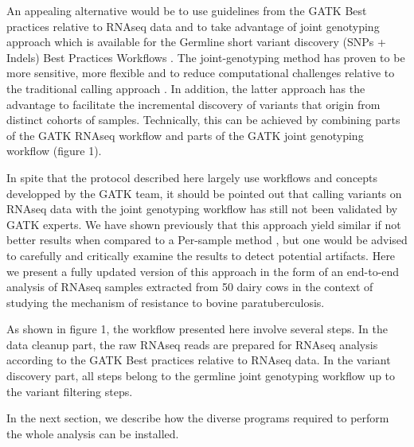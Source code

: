\documentclass[]{article}
\begin{document}
An appealing alternative would be to use guidelines from the GATK Best practices relative to RNAseq data and to take advantage of joint genotyping approach which is available for the Germline short variant discovery (SNPs + Indels) Best Practices Workflows \cite{GATK_BP_Germline}. The joint-genotyping method has proven to be more sensitive, more flexible and to reduce computational challenges relative to the traditional calling approach \cite{GATK_jointCalling_1}. In addition, the latter approach has the advantage to facilitate the incremental discovery of variants that origin from distinct cohorts of samples. Technically, this can be achieved by combining parts of the GATK RNAseq workflow and parts of the GATK joint genotyping workflow (figure 1).

In spite that the protocol described here largely use workflows and concepts developped by the GATK team, it should be pointed out that calling variants on RNAseq data with the joint genotyping workflow has still not been validated by GATK experts. We have shown previously that this approach yield similar if not better results when compared to a Per-sample method \cite{Brouard2019}, but one would be advised to carefully and critically examine the results to detect potential artifacts. Here we present a fully updated version of this approach in the form of an end-to-end analysis of RNAseq samples extracted from 50 dairy cows in the context of studying the mechanism of resistance to bovine paratuberculosis.



As shown in figure 1, the workflow presented here involve several steps. In the data cleanup part, the raw RNAseq reads are prepared for RNAseq analysis according to the GATK Best practices relative to RNAseq data. In the variant discovery part, all steps belong to the germline joint genotyping workflow up to the variant filtering steps.  



In the next section, we describe how the diverse programs required to perform the whole analysis can be installed.







\end{document}
